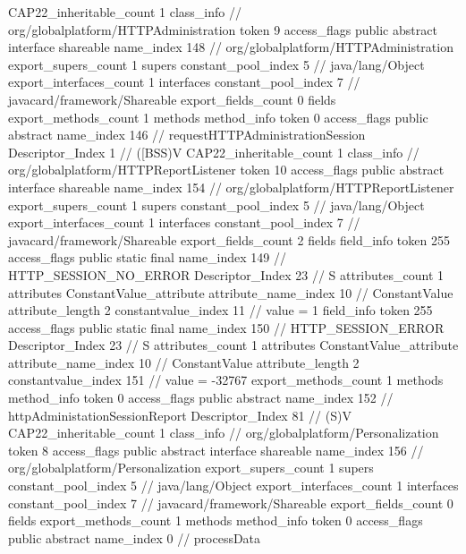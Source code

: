 {{{{{				}
			}
			CAP22_inheritable_count	1
		}
		class_info {		// org/globalplatform/HTTPAdministration
			token	9
			access_flags	public abstract interface shareable
			name_index	148		// org/globalplatform/HTTPAdministration
			export_supers_count	1
			supers {
				constant_pool_index	5		// java/lang/Object
			}
			export_interfaces_count	1
			interfaces {
				constant_pool_index	7		// javacard/framework/Shareable
			}
			export_fields_count	0
			fields {
			}
			export_methods_count	1
			methods {
				method_info {
					token	0
					access_flags	public abstract
					name_index	146		// requestHTTPAdministrationSession
					Descriptor_Index	1		// ([BSS)V
				}
			}
			CAP22_inheritable_count	1
		}
		class_info {		// org/globalplatform/HTTPReportListener
			token	10
			access_flags	public abstract interface shareable
			name_index	154		// org/globalplatform/HTTPReportListener
			export_supers_count	1
			supers {
				constant_pool_index	5		// java/lang/Object
			}
			export_interfaces_count	1
			interfaces {
				constant_pool_index	7		// javacard/framework/Shareable
			}
			export_fields_count	2
			fields {
			field_info {
				token	255
				access_flags	public static final
				name_index	149		// HTTP_SESSION_NO_ERROR
				Descriptor_Index	23		// S
				attributes_count	1
				attributes {
				ConstantValue_attribute {
					attribute_name_index	10		// ConstantValue
					attribute_length	2
					constantvalue_index	11		// value = 1
				}
				}
			}
			field_info {
				token	255
				access_flags	public static final
				name_index	150		// HTTP_SESSION_ERROR
				Descriptor_Index	23		// S
				attributes_count	1
				attributes {
				ConstantValue_attribute {
					attribute_name_index	10		// ConstantValue
					attribute_length	2
					constantvalue_index	151		// value = -32767
				}
				}
			}
			}
			export_methods_count	1
			methods {
				method_info {
					token	0
					access_flags	public abstract
					name_index	152		// httpAdministationSessionReport
					Descriptor_Index	81		// (S)V
				}
			}
			CAP22_inheritable_count	1
		}
		class_info {		// org/globalplatform/Personalization
			token	8
			access_flags	public abstract interface shareable
			name_index	156		// org/globalplatform/Personalization
			export_supers_count	1
			supers {
				constant_pool_index	5		// java/lang/Object
			}
			export_interfaces_count	1
			interfaces {
				constant_pool_index	7		// javacard/framework/Shareable
			}
			export_fields_count	0
			fields {
			}
			export_methods_count	1
			methods {
				method_info {
					token	0
					access_flags	public abstract
					name_index	0		// processData
}}}}}
